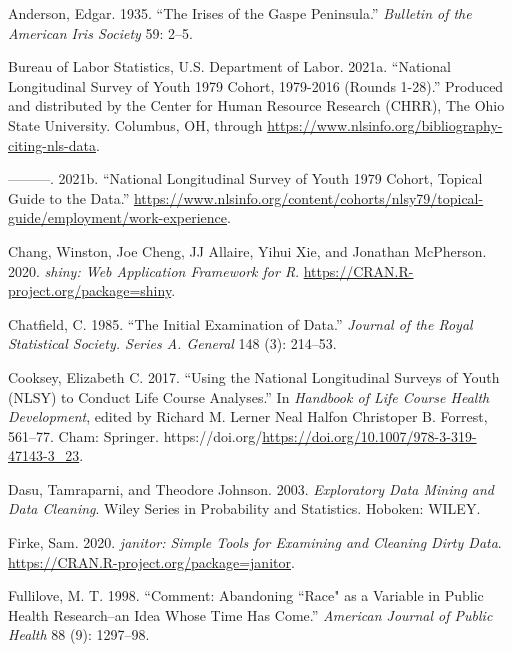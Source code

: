 \documentclass[12pt]{article}
\newlength{\cslhangindent}
\newlength{\cslentryspacingunit} %
\newenvironment{CSLReferences}[2] %
 {%
  \setlength{\parindent}{0pt}
  \ifodd #1
  \let\oldpar\par
  \def\par{\hangindent=\cslhangindent\oldpar}
  \fi
  \setlength{\parskip}{#2\cslentryspacingunit}
 }%
 {}
\begin{document}
\hypertarget{refs}{}
\begin{CSLReferences}{1}{0}
\leavevmode{}%
Anderson, Edgar. 1935. {``The Irises of the Gaspe Peninsula.''} \emph{Bulletin of the American Iris Society} 59: 2--5.

\leavevmode{}%
Bureau of Labor Statistics, U.S. Department of Labor. 2021a. {``National Longitudinal Survey of Youth 1979 Cohort, 1979-2016 (Rounds 1-28).''} Produced and distributed by the Center for Human Resource Research (CHRR), The Ohio State University. Columbus, OH, through \url{https://www.nlsinfo.org/bibliography-citing-nls-data}.

\leavevmode{}%
---------. 2021b. {``National Longitudinal Survey of Youth 1979 Cohort, Topical Guide to the Data.''} \url{https://www.nlsinfo.org/content/cohorts/nlsy79/topical-guide/employment/work-experience}.

\leavevmode{}%
Chang, Winston, Joe Cheng, JJ Allaire, Yihui Xie, and Jonathan McPherson. 2020. \emph{{shiny: Web Application Framework for R}}. \url{https://CRAN.R-project.org/package=shiny}.

\leavevmode{}%
Chatfield, C. 1985. {``The Initial Examination of Data.''} \emph{Journal of the Royal Statistical Society. Series A. General} 148 (3): 214--53.

\leavevmode{}%
Cooksey, Elizabeth C. 2017. {``Using the National Longitudinal Surveys of Youth ({NLSY}) to Conduct Life Course Analyses.''} In \emph{Handbook of Life Course Health Development}, edited by Richard M. Lerner Neal Halfon Christoper B. Forrest, 561--77. Cham: Springer. https://doi.org/\url{https://doi.org/10.1007/978-3-319-47143-3_23}.

\leavevmode{}%
Dasu, Tamraparni, and Theodore Johnson. 2003. \emph{Exploratory Data Mining and Data Cleaning}. Wiley Series in Probability and Statistics. Hoboken: WILEY.

\leavevmode{}%
Firke, Sam. 2020. \emph{{janitor: Simple Tools for Examining and Cleaning Dirty Data}}. \url{https://CRAN.R-project.org/package=janitor}.

\leavevmode{}%
Fullilove, M. T. 1998. {``Comment: Abandoning ``Race" as a Variable in Public Health Research--an Idea Whose Time Has Come.''} \emph{American Journal of Public Health} 88 (9): 1297--98.


\end{CSLReferences}
\end{document}

